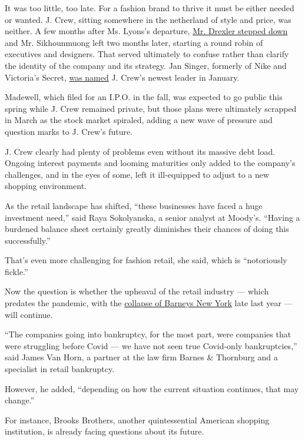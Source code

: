 It was too little, too late. For a fashion brand to thrive it must be
either needed or wanted. J. Crew, sitting somewhere in the netherland of
style and price, was neither. A few months after Ms. Lyons's departure,
\href{https://www.nytimes3xbfgragh.onion/2017/06/05/business/jcrew-mickey-drexler.html}{Mr.
Drexler stepped down} and Mr. Sikhounmuong left two months later,
starting a round robin of executives and designers. That served
ultimately to confuse rather than clarify the identity of the company
and its strategy. Jan Singer, formerly of Nike and Victoria's Secret,
\href{https://www.nytimes3xbfgragh.onion/2020/01/28/business/j-crew-jan-singer.html}{was
named} J. Crew's newest leader in January.

Madewell, which filed for an I.P.O. in the fall, was expected to go
public this spring while J. Crew remained private, but those plans were
ultimately scrapped in March as the stock market spiraled, adding a new
wave of pressure and question marks to J. Crew's future.

J. Crew clearly had plenty of problems even without its massive debt
load. Ongoing interest payments and looming maturities only added to the
company's challenges, and in the eyes of some, left it ill-equipped to
adjust to a new shopping environment.

As the retail landscape has shifted, ``these businesses have faced a
huge investment need,'' said Raya Sokolyanska, a senior analyst at
Moody's. ``Having a burdened balance sheet certainly greatly diminishes
their chances of doing this successfully.''

That's even more challenging for fashion retail, she said, which is
``notoriously fickle.''

Now the question is whether the upheaval of the retail industry ---
which predates the pandemic, with the
\href{https://www.nytimes3xbfgragh.onion/2019/11/01/business/barneys-bankruptcy-authentic-brands.html}{collapse
of Barneys New York} late last year --- will continue.

``The companies going into bankruptcy, for the most part, were companies
that were struggling before Covid --- we have not seen true Covid-only
bankruptcies,'' said James Van Horn, a partner at the law firm Barnes \&
Thornburg and a specialist in retail bankruptcy.

However, he added, ``depending on how the current situation continues,
that may change.''

For instance, Brooks Brothers, another quintessential American shopping
institution, is already facing questions about its future.

